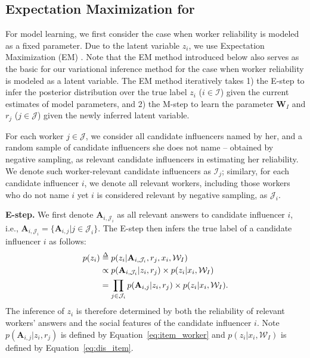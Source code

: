 \subsection{Expectation Maximization for \sys} 
\label{sec:em}
For model learning, we first consider the case when worker reliability is modeled as a fixed parameter. Due to the latent variable $z_i$, we use Expectation Maximization (EM) \cite{dempster1977maximum}. Note that the EM method introduced below also serves as the basic for our variational inference method for the case when worker reliability is modeled as a latent variable. The EM method iteratively takes 1) the E-step to infer the posterior distribution over the true label $z_i$ ($i\in \mathcal{I}$) given the current estimates of model parameters, and 2) the M-step to learn the parameter $\mathbf{W}_I$ and $r_j$ ($j\in \mathcal{J}$) given the newly inferred latent variable.

For each worker $j\in \mathcal{J}$, we consider all candidate influencers named by her, and a random sample of candidate influencers she does not name -- obtained by negative sampling, as relevant candidate influencers in estimating her reliability. We denote such worker-relevant candidate influencers as $\mathcal{I}_j$; similary, for each candidate influencer $i$, we denote all relevant workers, including those workers who do not name $i$ yet $i$ is considered relevant by negative sampling, as $\mathcal{J}_i$.

\smallskip
\noindent\textbf{E-step.} We first denote $\mathbf{A}_{i,\mathcal{J}_i}$ as all relevant answers to candidate influencer $i$, i.e., $\mathbf{A}_{i,\mathcal{J}_i} = \{\mathbf{A}_{i,j}|j \in \mathcal{J}_i\}$. The E-step then infers the true label of a candidate influencer $i$ as follows:
%
\begin{align}
    p(z_i) & \delequal p(z_i|\mathbf{A}_{i,\mathcal{J}_i},r_{j},x_i,\mathcal{W}_I) \nonumber\\
        &\propto p(\mathbf{A}_{i,\mathcal{J}_i}|z_i,r_j)\times p(z_i|x_i,\mathcal{W}_I) \label{eq:dist_cond}\\
        &=\prod_{j \in \mathcal{J}_i} p(\mathbf{A}_{i,j}|z_i,r_{j})\times p(z_i|x_i,\mathcal{W}_I). \nonumber    
\end{align}
%
The inference of $z_i$ is therefore determined by both the reliability of relevant workers' answers and the social features of the candidate influencer $i$. Note $p(\mathbf{A}_{i,j}|z_i,r_{j})$ is defined by Equation~\ref{eq:item_worker} and $p(z_i|x_i,\mathcal{W}_I)$ is defined by Equation~\ref{eq:dis_item}.

